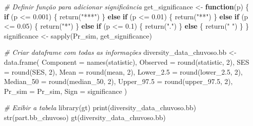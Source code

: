 \documentclass[
  letterpaper,
  DIV=11,
  numbers=noendperiod]{scrartcl}
\newenvironment{Shaded}{}{}
\newcommand{\AttributeTok}[1]{\textcolor[rgb]{0.49,0.56,0.16}{#1}}
\newcommand{\CommentTok}[1]{\textcolor[rgb]{0.38,0.63,0.69}{\textit{#1}}}
\newcommand{\ControlFlowTok}[1]{\textcolor[rgb]{0.00,0.44,0.13}{\textbf{#1}}}
\newcommand{\DecValTok}[1]{\textcolor[rgb]{0.25,0.63,0.44}{#1}}
\newcommand{\FloatTok}[1]{\textcolor[rgb]{0.25,0.63,0.44}{#1}}
\newcommand{\FunctionTok}[1]{\textcolor[rgb]{0.02,0.16,0.49}{#1}}
\newcommand{\NormalTok}[1]{#1}
\newcommand{\OtherTok}[1]{\textcolor[rgb]{0.00,0.44,0.13}{#1}}
\newcommand{\SpecialCharTok}[1]{\textcolor[rgb]{0.25,0.44,0.63}{#1}}
\newcommand{\StringTok}[1]{\textcolor[rgb]{0.25,0.44,0.63}{#1}}
\begin{document}
\begin{Shaded}
\begin{Highlighting}[numbers=left,,]
\CommentTok{\# Definir função para adicionar significância}
\NormalTok{get\_significance }\OtherTok{\textless{}{-}} \ControlFlowTok{function}\NormalTok{(p) \{}
  \ControlFlowTok{if}\NormalTok{ (p }\SpecialCharTok{\textless{}=} \FloatTok{0.001}\NormalTok{) \{}
    \FunctionTok{return}\NormalTok{(}\StringTok{"***"}\NormalTok{)}
\NormalTok{  \} }\ControlFlowTok{else} \ControlFlowTok{if}\NormalTok{ (p }\SpecialCharTok{\textless{}=} \FloatTok{0.01}\NormalTok{) \{}
    \FunctionTok{return}\NormalTok{(}\StringTok{"**"}\NormalTok{)}
\NormalTok{  \} }\ControlFlowTok{else} \ControlFlowTok{if}\NormalTok{ (p }\SpecialCharTok{\textless{}=} \FloatTok{0.05}\NormalTok{) \{}
    \FunctionTok{return}\NormalTok{(}\StringTok{"*"}\NormalTok{)}
\NormalTok{  \} }\ControlFlowTok{else} \ControlFlowTok{if}\NormalTok{ (p }\SpecialCharTok{\textless{}=} \FloatTok{0.1}\NormalTok{) \{}
    \FunctionTok{return}\NormalTok{(}\StringTok{"."}\NormalTok{)}
\NormalTok{  \} }\ControlFlowTok{else}\NormalTok{ \{}
    \FunctionTok{return}\NormalTok{(}\StringTok{" "}\NormalTok{)}
\NormalTok{  \}}
\NormalTok{\}}
\NormalTok{significance }\OtherTok{\textless{}{-}} \FunctionTok{sapply}\NormalTok{(Pr\_sim, get\_significance)}

\CommentTok{\# Criar dataframe com todas as informações}
\NormalTok{diversity\_data\_chuvoso.bb }\OtherTok{\textless{}{-}} \FunctionTok{data.frame}\NormalTok{(}
  \AttributeTok{Component =} \FunctionTok{names}\NormalTok{(statistic),}
  \AttributeTok{Observed =} \FunctionTok{round}\NormalTok{(statistic, }\DecValTok{2}\NormalTok{),}
  \AttributeTok{SES =} \FunctionTok{round}\NormalTok{(SES, }\DecValTok{2}\NormalTok{),}
  \AttributeTok{Mean =} \FunctionTok{round}\NormalTok{(mean, }\DecValTok{2}\NormalTok{),}
  \AttributeTok{Lower\_2.5 =} \FunctionTok{round}\NormalTok{(lower\_2}\FloatTok{.5}\NormalTok{, }\DecValTok{2}\NormalTok{),}
  \AttributeTok{Median\_50 =} \FunctionTok{round}\NormalTok{(median\_50, }\DecValTok{2}\NormalTok{),}
  \AttributeTok{Upper\_97.5 =} \FunctionTok{round}\NormalTok{(upper\_97}\FloatTok{.5}\NormalTok{, }\DecValTok{2}\NormalTok{),}
  \AttributeTok{Pr\_sim =}\NormalTok{ Pr\_sim,}
  \AttributeTok{Sign =}\NormalTok{ significance}
\NormalTok{)}

\CommentTok{\# Exibir a tabela}
\FunctionTok{library}\NormalTok{(gt)}
\FunctionTok{print}\NormalTok{(diversity\_data\_chuvoso.bb)}
\FunctionTok{str}\NormalTok{(part.bb\_chuvoso)}
\FunctionTok{gt}\NormalTok{(diversity\_data\_chuvoso.bb)}


\end{Highlighting}
\end{Shaded}
\end{document}
